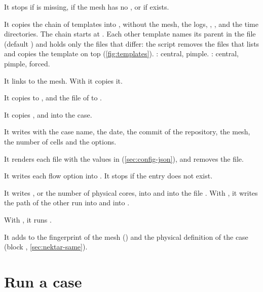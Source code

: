 \begin{steps}
\item It stops if  is missing, if the mesh has no
  , or if  exists.
\item It copies the chain of templates into , without the mesh, the
  logs, , ,  and the time directories.
  The chain starts at . Each other template names its parent in the
  file  (default ) and holds only the files that differ: the
  script removes the files that  lists and copies the template on
  top (\cref{fig:templates}). : central, pimple. : central,
  pimple, forced.
\item It links  to the mesh. With  it copies it.
\item It copies  to , and the file of
   to .
\item It copies ,  and
   into the case.
\item It writes  with the case name, the date, the commit of the
  repository, the mesh, the number of cells and the options.
\item It renders each  file with the values in 
  (\cref{sec:config-json}), and removes the  file.
\item It writes each flow option into . It stops if the
  entry does not exist.
\item It writes , or the number of physical cores, into  and  into the
  file . With , it writes the path of the other run into
   and into .
\item With , it runs .
\item It adds to  the fingerprint of the mesh () and the
  physical definition of the case (block , \cref{sec:nektar-same}).
\end{steps}

\section{Run a case}\label{sec:run-case}

